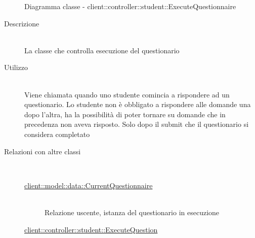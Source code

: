 \vspace{0.5cm}
\hypertarget{client::controller::student::ExecuteQuestionnaire}{}
\begin{figure}[H]
	\centering
	\caption{Diagramma classe - client::controller::student::ExecuteQuestionnaire}
\end{figure}\begin{description}
\item[Descrizione] \hfill \\
La classe che controlla esecuzione del questionario 
\item[Utilizzo] \hfill \\
Viene chiamata quando uno studente comincia a rispondere ad un questionario. Lo studente non è obbligato a rispondere alle domande una dopo l'altra, ha la possibilità di poter tornare su domande che in precedenza non aveva risposto. Solo dopo il submit che il questionario si considera completato
\item[Relazioni con altre classi] \hfill \\
\vspace{-7mm}
\begin{description}
	\item[\hyperlink{client::model::data::CurrentQuestionnaire}{client::model::data::CurrentQuestionnaire}] \hfill \\
	Relazione uscente, istanza del questionario in esecuzione
	\item[\hyperlink{client::controller::student::ExecuteQuestion}{client::controller::student::ExecuteQuestion}] \hfill \\

\end{description}
\end{description}
